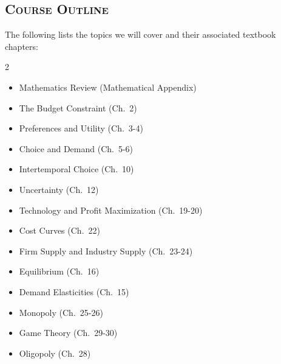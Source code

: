 \documentclass[10pt]{article}
\begin{document}
\subsection*{\textsc{Course Outline}}
The following lists the topics we will cover and their associated textbook chapters:
\begin{multicols}{2}
  \begin{itemize}
    \item Mathematics Review (Mathematical Appendix)
    \item The Budget Constraint (Ch.~2)
    \item Preferences and Utility (Ch.~3-4)
    \item Choice and Demand (Ch.~5-6)
    \item Intertemporal Choice (Ch.~10)
    \item Uncertainty (Ch.~12)
    \item Technology and Profit Maximization (Ch.~19-20)
    \item Cost Curves (Ch.~22)
    \item Firm Supply and Industry Supply (Ch.~23-24)
    \item Equilibrium (Ch.~16)
    \item Demand Elasticities (Ch.~15)
    \item Monopoly (Ch.~25-26)
    \item Game Theory (Ch.~29-30)
    \item Oligopoly (Ch.~28)
  \end{itemize}
\end{multicols}
\end{document}
